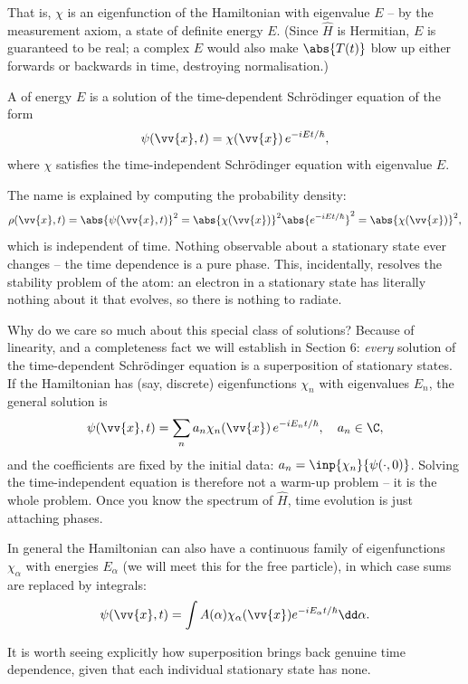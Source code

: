That is, $\chi$ is an eigenfunction of the Hamiltonian with eigenvalue $E$ -- by the measurement axiom, a state of definite energy $E$. (Since $\hat{H}$ is Hermitian, $E$ is guaranteed to be real; a complex $E$ would also make $\abs{T(t)}$ blow up either forwards or backwards in time, destroying normalisation.)

\begin{definition}
    A  of energy $E$ is a solution of the time-dependent Schr\"odinger equation of the form
    $$
    \psi(\vv{x}, t) = \chi(\vv{x}) \, e^{-iEt/\hbar},
    $$
    where $\chi$ satisfies the time-independent Schr\"odinger equation with eigenvalue $E$.
\end{definition}

The name is explained by computing the probability density:
$$
\rho(\vv{x}, t) = \abs{\psi(\vv{x}, t)}^2 = \abs{\chi(\vv{x})}^2 \abs{e^{-iEt/\hbar}}^2 = \abs{\chi(\vv{x})}^2,
$$
which is independent of time. Nothing observable about a stationary state ever changes -- the time dependence is a pure phase. This, incidentally, resolves the stability problem of the atom: an electron in a stationary state has literally nothing about it that evolves, so there is nothing to radiate.

Why do we care so much about this special class of solutions? Because of linearity, and a completeness fact we will establish in Section 6: \emph{every} solution of the time-dependent Schr\"odinger equation is a superposition of stationary states. If the Hamiltonian has (say, discrete) eigenfunctions $\chi_n$ with eigenvalues $E_n$, the general solution is
$$
\psi(\vv{x}, t) = \sum_n a_n \chi_n(\vv{x}) \, e^{-iE_n t/\hbar}, \quad a_n \in \C,
$$
and the coefficients are fixed by the initial data: $a_n = \inp{\chi_n}{\psi(\cdot, 0)}$. Solving the time-independent equation is therefore not a warm-up problem -- it is the whole problem. Once you know the spectrum of $\hat{H}$, time evolution is just attaching phases.

In general the Hamiltonian can also have a continuous family of eigenfunctions $\chi_\alpha$ with energies $E_\alpha$ (we will meet this for the free particle), in which case sums are replaced by integrals:
$$
\psi(\vv{x}, t) = \int A(\alpha) \chi_\alpha(\vv{x}) e^{-i E_\alpha t / \hbar} \dd \alpha.
$$

It is worth seeing explicitly how superposition brings back genuine time dependence, given that each individual stationary state has none.

